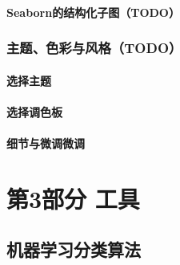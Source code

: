 \documentclass[
  letterpaper,
  DIV=11,
  numbers=noendperiod]{scrreprt}
\begin{document}
\hypertarget{seabornux7684ux7ed3ux6784ux5316ux5b50ux56fetodo}{%
\subsection{Seaborn的结构化子图（TODO）}\label{seabornux7684ux7ed3ux6784ux5316ux5b50ux56fetodo}}

\hypertarget{ux4e3bux9898ux8272ux5f69ux4e0eux98ceux683ctodo}{%
\section{主题、色彩与风格（TODO）}\label{ux4e3bux9898ux8272ux5f69ux4e0eux98ceux683ctodo}}

\hypertarget{ux9009ux62e9ux4e3bux9898}{%
\subsection{选择主题}\label{ux9009ux62e9ux4e3bux9898}}

\hypertarget{ux9009ux62e9ux8c03ux8272ux677f}{%
\subsection{选择调色板}\label{ux9009ux62e9ux8c03ux8272ux677f}}

\hypertarget{ux7ec6ux8282ux4e0eux5faeux8c03ux5faeux8c03}{%
\subsection{细节与微调微调}\label{ux7ec6ux8282ux4e0eux5faeux8c03ux5faeux8c03}}

\part{第3部分 工具}

\hypertarget{ux673aux5668ux5b66ux4e60ux5206ux7c7bux7b97ux6cd5}{%
\chapter{机器学习分类算法}\label{ux673aux5668ux5b66ux4e60ux5206ux7c7bux7b97ux6cd5}}
\end{document}
